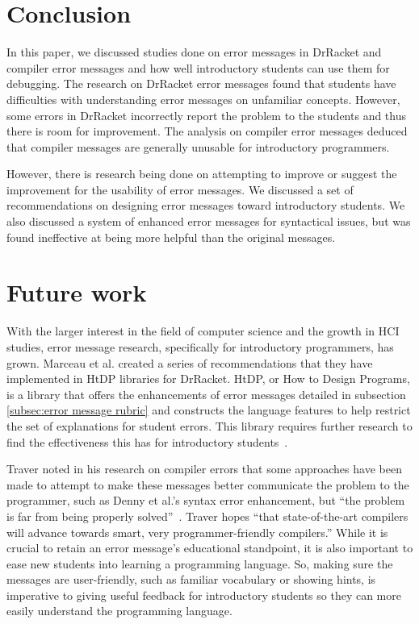 \documentclass{sig-alternate}
\begin{document}
\section{Conclusion}\label{sec:concl}

In this paper, we discussed studies done on error messages in DrRacket and compiler error messages and how well introductory students can use them for debugging.
The research on DrRacket error messages found that students have difficulties with understanding error messages on unfamiliar concepts.
However, some errors in DrRacket incorrectly report the problem to the students and thus there is room for improvement.
The analysis on compiler error messages deduced that compiler messages are generally unusable for introductory programmers.

However, there is research being done on attempting to improve or suggest the improvement for the usability of error messages.
We discussed a set of recommendations on designing error messages toward introductory students.
We also discussed a system of enhanced error messages for syntactical issues, but was found ineffective at being more helpful than the original messages.

\section{Future work}\label{sec:ftrwrk}

With the larger interest in the field of computer science and the growth in HCI studies, error message research, specifically for introductory programmers, has grown.
Marceau et al. created a series of recommendations that they have implemented in HtDP libraries for DrRacket.
HtDP, or How to Design Programs, is a library that offers the enhancements of error messages detailed in subsection \ref{subsec:error message rubric} and constructs the language features to help restrict the set of explanations for student errors.
This library requires further research to find the effectiveness this has for introductory students~\cite{htdp-teachpacks}.

Traver noted in his research on compiler errors that some approaches have been made to attempt to make these messages better communicate the problem to the programmer, such as Denny et al.'s syntax error enhancement, but ``the problem is far from being properly solved''~\cite{Traver:2010}. 
Traver hopes ``that state-of-the-art compilers will advance towards smart, very programmer-friendly compilers.''
While it is crucial to retain an error message's educational standpoint, it is also important to ease new students into learning a programming language.
So, making sure the messages are user-friendly, such as familiar vocabulary or showing hints, is imperative to giving useful feedback for introductory students so they can more easily understand the programming language.
\end{document}
